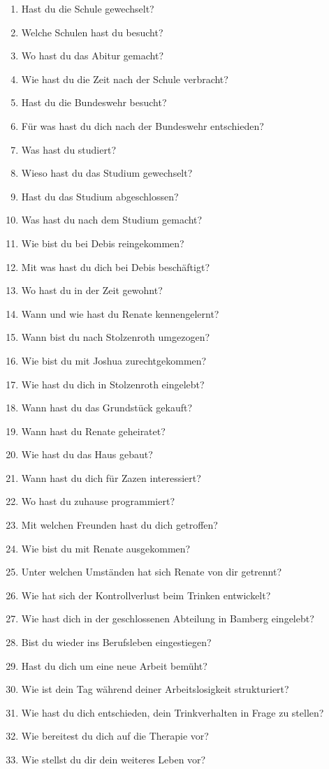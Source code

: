 \documentclass[10pt,a4paper]{article}
\begin{document}
\begin{minipage}{0.9\textwidth}
\begin{enumerate}
  \item Hast du die Schule gewechselt?
  \item Welche Schulen hast du besucht?
  \item Wo hast du das Abitur gemacht?
  \item Wie hast du die Zeit nach der Schule verbracht?
  \item Hast du die Bundeswehr besucht?
  \item Für was hast du dich nach der Bundeswehr entschieden?
  \item Was hast du studiert?
  \item Wieso hast du das Studium gewechselt?
  \item Hast du das Studium abgeschlossen?
  \item Was hast du nach dem Studium gemacht?
  \item Wie bist du bei Debis reingekommen?
  \item Mit was hast du dich bei Debis beschäftigt?
  \item Wo hast du in der Zeit gewohnt?
  \item Wann und wie hast du Renate kennengelernt?
  \item Wann bist du nach Stolzenroth umgezogen?
  \item Wie bist du mit Joshua zurechtgekommen?
  \item Wie hast du dich in Stolzenroth eingelebt?
  \item Wann hast du das Grundstück gekauft?
  \item Wann hast du Renate geheiratet?
  \item Wie hast du das Haus gebaut?
  \item Wann hast du dich für Zazen interessiert?
  \item Wo hast du zuhause programmiert?
  \item Mit welchen Freunden hast du dich getroffen?
  \item Wie bist du mit Renate ausgekommen?
  \item Unter welchen Umständen hat sich Renate von dir getrennt?
  \item Wie hat sich der Kontrollverlust beim Trinken entwickelt?
  \item Wie hast dich in der geschlossenen Abteilung in Bamberg eingelebt?
  \item Bist du wieder ins Berufsleben eingestiegen?
  \item Hast du dich um eine neue Arbeit bemüht?
  \item Wie ist dein Tag während deiner Arbeitslosigkeit strukturiert?
  \item Wie hast du dich entschieden, dein Trinkverhalten in Frage zu stellen?
  \item Wie bereitest du dich auf die Therapie vor?
  \item Wie stellst du dir dein weiteres Leben vor?

  \end{enumerate}
\end{minipage}
\end{document}
